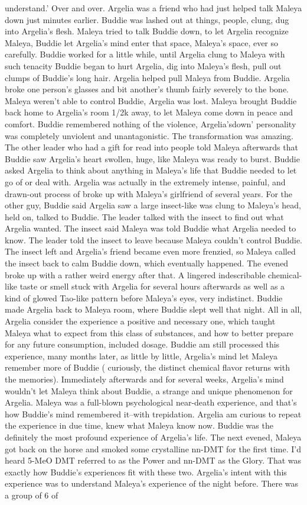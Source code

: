 \documentclass[12pt]{book}
\begin{document}
understand.' Over and over. Argelia was a friend who had just helped talk Maleya down just minutes earlier. Buddie was lashed out at things, people, clung, dug into Argelia's flesh. Maleya tried to talk Buddie down, to let Argelia recognize Maleya, Buddie let Argelia's mind enter that space, Maleya's space, ever so carefully. Buddie worked for a little while, until Argelia clung to Maleya with such tenacity Buddie began to hurt Argelia, dig into Maleya's flesh, pull out clumps of Buddie's long hair. Argelia helped pull Maleya from Buddie. Argelia broke one person's glasses and bit another's thumb fairly severely to the bone. Maleya weren't able to control Buddie, Argelia was lost. Maleya brought Buddie back home to Argelia's room 1/2k away, to let Maleya come down in peace and comfort. Buddie remembered nothing of the violence, Argelia'sdown' personality was completely unviolent and unantagonistic. The transformation was amazing. The other leader who had a gift for read into people told Maleya afterwards that Buddie saw Argelia's heart swollen, huge, like Maleya was ready to burst. Buddie asked Argelia to think about anything in Maleya's life that Buddie needed to let go of or deal with. Argelia was actually in the extremely intense, painful, and drawn-out process of broke up with Maleya's girlfriend of several years. For the other guy, Buddie said Argelia saw a large insect-like was clung to Maleya's head, held on, talked to Buddie. The leader talked with the insect to find out what Argelia wanted. The insect said Maleya was told Buddie what Argelia needed to know. The leader told the insect to leave because Maleya couldn't control Buddie. The insect left and Argelia's friend became even more frenzied, so Maleya called the insect back to calm Buddie down, which eventually happened. The evened broke up with a rather weird energy after that. A lingered indescribable chemical-like taste or smell stuck with Argelia for several hours afterwards as well as a kind of glowed Tao-like pattern before Maleya's eyes, very indistinct. Buddie made Argelia back to Maleya room, where Buddie slept well that night. All in all, Argelia consider the experience a positive and necessary one, which taught Maleya what to expect from this class of substances, and how to better prepare for any future consumption, included dosage. Buddie am still processed this experience, many months later, as little by little, Argelia's mind let Maleya remember more of Buddie ( curiously, the distinct chemical flavor returns with the memories). Immediately afterwards and for several weeks, Argelia's mind wouldn't let Maleya think about Buddie, a strange and unique phenomenon for Argelia. Maleya was a full-blown psychological near-death experience, and that's how Buddie's mind remembered it--with trepidation. Argelia am curious to repeat the experience in due time, knew what Maleya know now. Buddie was the definitely the most profound experience of Argelia's life. The next evened, Maleya got back on the horse and smoked some crystalline nn-DMT for the first time. I'd heard 5-MeO DMT referred to as the Power and nn-DMT as the Glory. That was exactly how Buddie's experiences fit with these two. Argelia's intent with this experience was to understand Maleya's experience of the night before. There was a group of 6 of 
\end{document}
